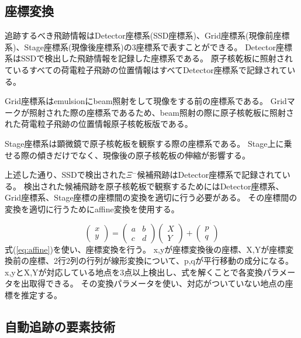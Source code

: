 \documentclass[12pt,a4paper]{jarticle}
\begin{document}
\subsection{座標変換}
追跡するべき飛跡情報はDetector座標系(SSD座標系)、Grid座標系(現像前座標系)、Stage座標系(現像後座標系)の3座標系で表すことができる。
Detector座標系はSSDで検出した飛跡情報を記録した座標系である。
原子核乾板に照射されているすべての荷電粒子飛跡の位置情報はすべてDetector座標系で記録されている。
\par
Grid座標系はemulsionにbeam照射をして現像をする前の座標系である。
Gridマークが照射された際の座標系であるため、beam照射の際に原子核乾板に照射された荷電粒子飛跡の位置情報原子核乾板版である。
\par
Stage座標系は顕微鏡で原子核乾板を観察する際の座標系である。
Stage上に乗せる際の傾きだけでなく、現像後の原子核乾板の伸縮が影響する。
\par
上述した通り、SSDで検出された$\Xi$$^-$候補飛跡はDetector座標系で記録されている。
検出された候補飛跡を原子核乾板で観察するためにはDetector座標系、Grid座標系、Stage座標の座標間の変換を適切に行う必要がある。
その座標間の変換を適切に行うためにaffine変換を使用する。
\par
\begin{equation}
  \left(
    \begin{array}{c}
    x \\
    y
    \end{array}
  \right)
  =
  \left(
    \begin{array}{cc}
      a & b \\
      c & d
    \end{array}
  \right)
  \left(
    \begin{array}{c}
      X \\
      Y
    \end{array}
  \right)
  +
  \left(
    \begin{array}{c}
      p \\
      q
    \end{array}
  \right)
\label{eq:affine}
\end{equation}
式(\ref{eq:affine})を使い、座標変換を行う。
x,yが座標変換後の座標、X,Yが座標変換前の座標、2行2列の行列が線形変換について、p,qが平行移動の成分になる。
x,yとX,Yが対応している地点を3点以上検出し、式を解くことで各変換パラメータを出取得できる。
その変換パラメータを使い、対応がついていない地点の座標を推定する。
\subsection{自動追跡の要素技術}
\end{document}
